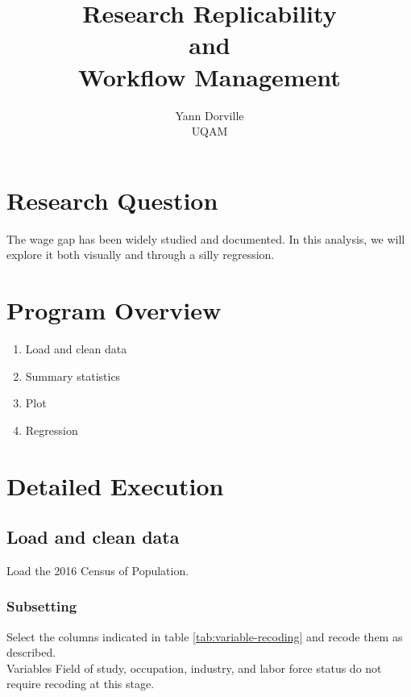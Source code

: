 \documentclass[12pt]{article}
\begin{document}

 
 
\title{Research Replicability \\and \\Workflow Management}
\author{Yann Dorville\\UQAM}

\maketitle

\section{Research Question}
The wage gap has been widely studied and documented. In this analysis, we will explore it both visually and through a silly regression.

\section{Program Overview}
\begin{enumerate} 
  \item Load and clean data 
  \item Summary statistics
  \item Plot
  \item Regression
\end{enumerate}


\section{Detailed Execution}
\subsection{Load and clean data}
Load the 2016 Census of Population.

\subsubsection*{Subsetting}
Select the columns indicated in table \ref{tab:variable-recoding} and recode them as described.\\
Variables Field of study, occupation, industry, and labor force status do not require recoding at this stage.
\end{document}
